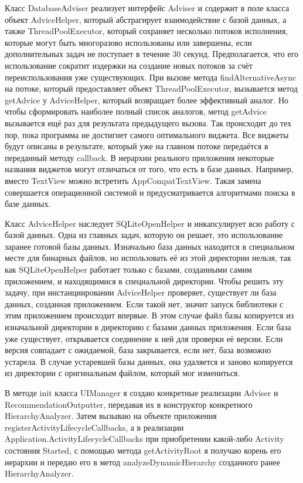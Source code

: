 \documentclass[a4paper,14pt]{extarticle} %
\begin{document}
	Класс DatabaseAdviser реализует интерфейс Adviser и содержит в поле класса объект AdviceHelper, который абстрагирует взаимодействие с базой данных, а также ThreadPoolExecutor, который сохраняет несколько потоков исполнения, которые могут быть многоразово использованы или завершены, если дополнительных задач не поступает в течение 30 секунд. Предполагается, что его использование сократит издержки на создание новых потоков за счёт переиспользования уже существующих. При вызове метода findAlternativeAsync на потоке, который предоставляет объект ThreadPoolExecutor, вызывается метод getAdvice у AdviceHelper, который возвращает более эффективный аналог. Но чтобы сформировать наиболее полный список аналогов, метод getAdvice вызывается ещё раз для результата предыдущего вызова. Так происходит до тех пор, пока программа не достигнет самого оптимального виджета. Все виджеты будут описаны в результате, который уже на главном потоке передаётся в переданный методу callback. В иерархии реального приложения некоторые названия виджетов могут отличаться от того, что есть в базе данных. Например, вместо TextView можно встретить AppCompatTextView. Такая замена совершается операционной системой и предусматривается алгоритмами поиска в базе данных.
	
	Класс AdviceHelper наследует SQLiteOpenHelper и инкапсулирует всю работу с базой данных. Одна из главных задач, которую он решает, это использование заранее готовой базы данных. Изначально база данных находится в специальном месте для бинарных файлов, но использовать её из этой директории нельзя, так как SQLiteOpenHelper работает только с базами, созданными самим приложением, и находящимися в специальной директории. Чтобы решить эту задачу, при инстанциировании AdviceHelper проверяет, существует ли база данных, созданная приложением. Если такой нет, значит запуск библиотеки с этим приложением происходит впервые. В этом случае файл базы копируется из изначальной директории в директорию с базами данных приложения. Если база уже существует, открывается соединение к ней для проверки её версии. Если версия совпадает с ожидаемой, база закрывается, если нет, база возможно устарела. В случае устаревшей базы данных, она удаляется и заново копируется из директории с оригинальным файлом, который мог измениться.
	
	В методе init класса UIManager я создаю конкретные реализации Adviser и RecommendationOutputter, передавая их в конструктор конкретного HierarchyAnalyzer. Затем вызываю на объекте приложения registerActivityLifecycleCallbacks, а в реализации Application.ActivityLifecycleCallbacks при приобретении какой-либо Activity состояния Started, с помощью метода getActivityRoot я получаю корень его иерархии и передаю его в метод analyzeDynamicHierarchy созданного ранее HierarchyAnalyzer.
	
\end{document}
